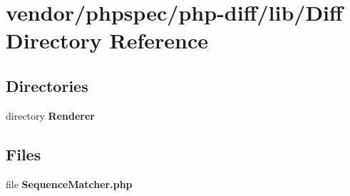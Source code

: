 \section{vendor/phpspec/php-\/diff/lib/\+Diff Directory Reference}
\label{dir_4351473c3b940f488c877f361edc0b9c}
\subsection*{Directories}
\begin{DoxyCompactItemize}
\item 
directory {\bf Renderer}
\end{DoxyCompactItemize}
\subsection*{Files}
\begin{DoxyCompactItemize}
\item 
file {\bf Sequence\+Matcher.\+php}
\end{DoxyCompactItemize}
